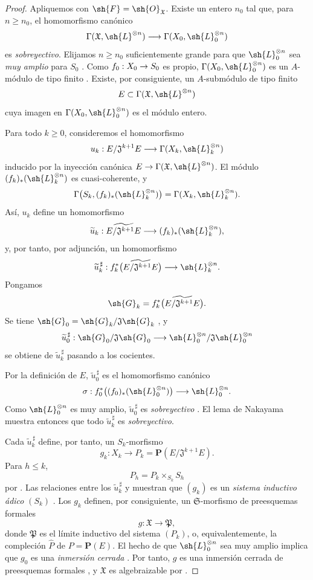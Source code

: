 \documentclass[oneside]{amsart}
\makeatletter
\renewcommand{\leq}{\leqslant}
\renewcommand{\geq}{\geqslant}
\newcommand{\ega@arrow}[2]{\mathchoice{#1}{#2}{#2}{#2}}
\renewcommand{\to}{\ega@arrow{\longrightarrow}{\rightarrow}}
\makeatother
\begin{document}
\begin{proof}
Apliquemos  con
$\sh{F}=\sh{O}_{\mathfrak{X}}$. Existe un entero $n_0$ tal
que, para $n\geq n_0$, el homomorfismo canónico
\[
  \Gamma(\mathfrak{X},\sh{L}^{\otimes n})
  \longrightarrow
  \Gamma(X_0,\sh{L}_0^{\otimes n})
\]
es \emph{sobreyectivo}. Elijamos $n\geq n_0$ suficientemente grande para que
$\sh{L}_0^{\otimes n}$ sea \emph{muy amplio} para $S_0$
. Como
$f_0:X_0\to S_0$ es propio,
$\Gamma(X_0,\sh{L}_0^{\otimes n})$ es un $A$-módulo de tipo finito
. Existe, por consiguiente, un
$A$-submódulo de tipo finito
\[
  E\subset\Gamma(\mathfrak{X},\sh{L}^{\otimes n})
\]
cuya imagen en $\Gamma(X_0,\sh{L}_0^{\otimes n})$ es el módulo
entero.

Para todo $k\geq0$, consideremos el homomorfismo
\[
  u_k:
  E/\mathfrak{J}^{k+1}E
  \longrightarrow
  \Gamma(X_k,\sh{L}_k^{\otimes n})
\]
inducido por la inyección canónica
$E\to\Gamma(\mathfrak{X},\sh{L}^{\otimes n})$. El módulo
$(f_k)_*(\sh{L}_k^{\otimes n})$ es cuasi-coherente, y
\[
  \Gamma\bigl(S_k,(f_k)_*(\sh{L}_k^{\otimes n})\bigr)
  =
  \Gamma(X_k,\sh{L}_k^{\otimes n}).
\]
Así, $u_k$ define un homomorfismo
\[
  \widetilde{u}_k:
  \widetilde{E/\mathfrak{J}^{k+1}E}
  \longrightarrow
  (f_k)_*(\sh{L}_k^{\otimes n}),
\]
y, por tanto, por adjunción, un homomorfismo
\[
  \widetilde{u}_k^{\,\sharp}:
  f_k^*\bigl(\widetilde{E/\mathfrak{J}^{k+1}E}\bigr)
  \longrightarrow
  \sh{L}_k^{\otimes n}.
\]
Pongamos
\[
  \sh{G}_k=
  f_k^*\bigl(\widetilde{E/\mathfrak{J}^{k+1}E}\bigr).
\]
Se tiene
$\sh{G}_0=\sh{G}_k/\mathfrak{J}\sh{G}_k$
, y
\[
  \widetilde{u}_0^{\,\sharp}:
  \sh{G}_0/\mathfrak{J}\sh{G}_0
  \longrightarrow
  \sh{L}_0^{\otimes n}/
  \mathfrak{J}\sh{L}_0^{\otimes n}
\]
se obtiene de $\widetilde{u}_k^{\,\sharp}$ pasando a los
cocientes.

Por la definición de $E$, $\widetilde{u}_0^{\,\sharp}$ es el
homomorfismo canónico
\[
  \sigma:
  f_0^*\bigl((f_0)_*(\sh{L}_0^{\otimes n})\bigr)
  \longrightarrow
  \sh{L}_0^{\otimes n}.
\]
Como $\sh{L}_0^{\otimes n}$ es muy amplio,
$\widetilde{u}_0^{\,\sharp}$ es \emph{sobreyectivo}
. El lema de Nakayama muestra entonces que todo
$\widetilde{u}_k^{\,\sharp}$ es \emph{sobreyectivo}.

Cada $\widetilde{u}_k^{\,\sharp}$ define, por tanto,
 un $S_k$-morfismo
\[
  g_k:X_k\longrightarrow
  P_k=\mathbf{P}(E/\mathfrak{J}^{k+1}E).
\]
Para $h\leq k$,
\[
  P_h=P_k\times_{S_k}S_h
\]
por . Las relaciones entre los
$\widetilde{u}_k^{\,\sharp}$ y  muestran que
$(g_k)$ es un \emph{sistema inductivo ádico} $(S_k)$
. Los $g_k$ definen, por consiguiente, un
$\mathfrak{S}$-morfismo de preesquemas formales
\[
  g:\mathfrak{X}\longrightarrow\mathfrak{P},
\]
donde $\mathfrak{P}$ es el límite inductivo del sistema $(P_k)$,
o, equivalentemente, la compleción $\widehat{P}$ de
$P=\mathbf{P}(E)$. El hecho de que
$\sh{L}_0^{\otimes n}$ sea muy amplio implica que $g_0$ es una \emph{inmersión cerrada}
. Por tanto, $g$ es una inmersión cerrada de
preesquemas formales , y $\mathfrak{X}$ es algebraizable
por .


\end{proof}
\end{document}

